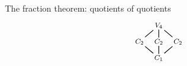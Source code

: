 \documentclass[8pt, handout]{beamer}
\begin{document}
\begin{frame}{The fraction theorem: quotients of quotients}
\[\begin{tikzpicture}[scale=.45,xscale=1,shorten >= -2pt, shorten <= -2pt]
\begin{scope}[shift={(11.5,0)}]
    \end{scope}
    \begin{scope}[shift={(17,0)}]
    \tikzstyle{every node}=[font=\footnotesize]
      \node(G) at (3.5,6) {$V_4$};
      \node(rs) at (3.5,4.5) {$C_2$};
      \node(r2-s) at (1.75,4.5) {$C_2$};
      \node(r) at (5.25,4.5) {$C_2$};
      \node(r2) at (3.5,3) {$C_1$};
      \draw[thick] (r2) -- (r2-s);
      \draw[thick] (r2) -- (r);
      \draw[thick] (r2) -- (rs);
      \draw[thick] (r2-s) -- (G);
      \draw[thick] (r) -- (G);
      \draw[thick] (rs) -- (G);
    \end{scope}
  \end{tikzpicture}
  \]

\end{frame}

\end{document}
